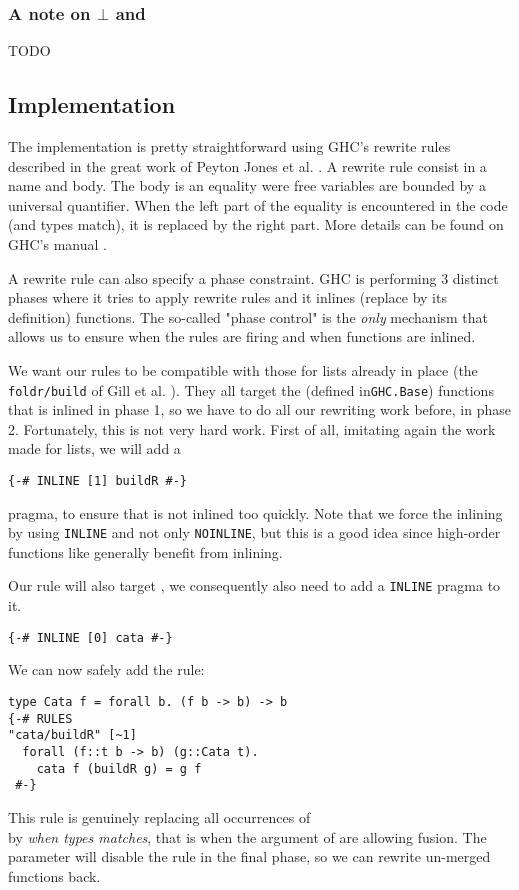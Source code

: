 \subsubsection{A note on $\bot$ and }
TODO

\subsection{Implementation}
The implementation is pretty straightforward using GHC's rewrite rules described in the great work of Peyton Jones et al. \cite{pbr}. A rewrite rule consist in a name and body. The body is an equality were free variables are bounded by a universal quantifier. When the left part of the equality is encountered in the code (and types match), it is replaced by the right part. More details can be found on GHC's manual \cite{ghc:manual}.

A rewrite rule can also specify a phase constraint. GHC is performing 3 distinct phases where it tries to apply rewrite rules and it inlines (replace by its definition) functions. The so-called "phase control" is the \emph{only} mechanism that allows us to ensure when the rules are firing and when functions are inlined.

We want our rules to be compatible with those for lists already in place (the \verb|foldr/build| of Gill et al. \cite{Gill:1993:SCD:165180.165214}). They all target the  (defined in\verb|GHC.Base|) functions that is inlined in phase 1, so we have to do all our rewriting work before, in phase 2. Fortunately, this is not very hard work. First of all, imitating again the work made for lists, we will add a
\begin{verbatim}
{-# INLINE [1] buildR #-}
\end{verbatim}
pragma, to ensure that  is not inlined too quickly. Note that we force the inlining by using \verb|INLINE| and not only \verb|NOINLINE|, but this is a good idea since high-order functions like  generally benefit from inlining.

Our rule will also target , we consequently also need to add a \verb|INLINE| pragma to it.
\begin{verbatim}
{-# INLINE [0] cata #-}
\end{verbatim}

\noindent We can now safely add the rule:
\begin{verbatim}
type Cata f = forall b. (f b -> b) -> b
{-# RULES
"cata/buildR" [~1]
  forall (f::t b -> b) (g::Cata t).
    cata f (buildR g) = g f
 #-}
\end{verbatim}
This rule is genuinely replacing all occurrences of\\  by  \emph{when types matches}, that is when the argument of  are allowing fusion. The \minline{[~1]} parameter will disable the rule in the final phase, so we can rewrite un-merged functions back.

